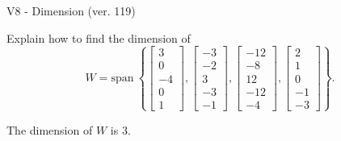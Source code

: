 \begin{exercise}
  \begin{exerciseTitle}V8 - Dimension (ver. 119)\end{exerciseTitle}
  \begin{exerciseStatement}
    Explain how to find the dimension of 
\[W=\mathrm{span}\ \left\{\left[\begin{array}{r}
3 \\
0 \\
-4 \\
0 \\
1
\end{array}\right] , \left[\begin{array}{r}
-3 \\
-2 \\
3 \\
-3 \\
-1
\end{array}\right] , \left[\begin{array}{r}
-12 \\
-8 \\
12 \\
-12 \\
-4
\end{array}\right] , \left[\begin{array}{r}
2 \\
1 \\
0 \\
-1 \\
-3
\end{array}\right]\right\}.\]



  \end{exerciseStatement}
  \begin{exerciseAnswer}
   The dimension of \(W\) is  \(3\).
  


  \end{exerciseAnswer}
\end{exercise}